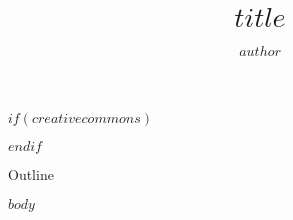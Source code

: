 \documentclass[$fontsize$, aspectratio=169]{beamer}
\author{$author$}
\title{$title$}
\begin{document}
\begin{frame}
  \titlepage
\end{frame}

$if(creativecommons)$
\begin{frame}
  \doclicenseThis
\end{frame}
$endif$

\begin{frame}{Outline}
  \tableofcontents
\end{frame}

$body$
\end{document}
